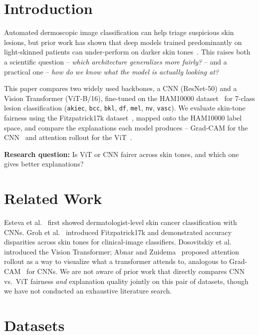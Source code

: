 \documentclass[twoside,a4paper,11pt]{article}
\begin{document}
\section{Introduction}
\label{sec:intro}

Automated dermoscopic image classification can help triage suspicious
skin lesions, but prior work has shown that deep models trained
predominantly on light-skinned patients can under-perform on darker skin
tones~\cite{Groh:21}. This raises both a scientific question --
\emph{which architecture generalizes more fairly?} -- and a practical
one -- \emph{how do we know what the model is actually looking at?}

This paper compares two widely used backbones, a CNN (ResNet-50) and a
Vision Transformer (ViT-B/16), fine-tuned on the HAM10000
dataset~\cite{Tschandl:18} for 7-class lesion classification
(\texttt{akiec}, \texttt{bcc}, \texttt{bkl}, \texttt{df}, \texttt{mel},
\texttt{nv}, \texttt{vasc}). We evaluate skin-tone fairness using the
Fitzpatrick17k dataset~\cite{Groh:21}, mapped onto the HAM10000 label
space, and compare the explanations each model produces -- Grad-CAM for
the CNN~\cite{Selvaraju:17} and attention rollout for the
ViT~\cite{Abnar:20,Dosovitskiy:21}.

\textbf{Research question:} Is ViT or CNN fairer across skin tones, and
which one gives better explanations?

\section{Related Work}
\label{sec:related}

Esteva et al.~\cite{Esteva:17} first showed dermatologist-level skin
cancer classification with CNNs. Groh et al.~\cite{Groh:21} introduced
Fitzpatrick17k and demonstrated accuracy disparities across skin tones
for clinical-image classifiers. Dosovitskiy et al.~\cite{Dosovitskiy:21}
introduced the Vision Transformer; Abnar and Zuidema~\cite{Abnar:20}
proposed attention rollout as a way to visualize what a transformer
attends to, analogous to Grad-CAM~\cite{Selvaraju:17} for CNNs. We are
not aware of prior work that directly compares CNN vs.\ ViT fairness
\emph{and} explanation quality jointly on this pair of datasets, though
we have not conducted an exhaustive literature search.

\section{Datasets}
\label{sec:datasets}
\end{document}
